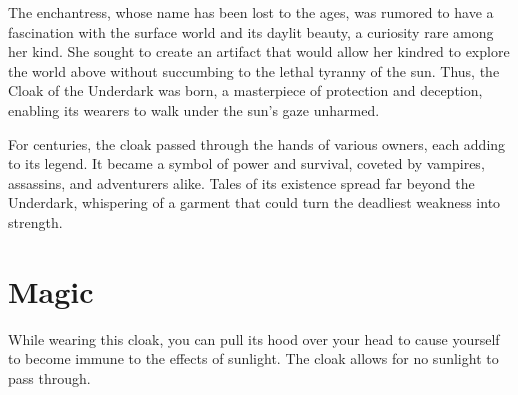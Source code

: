 The enchantress, whose name has been lost to the ages, was rumored to have a fascination with the surface world and its daylit beauty, a curiosity rare among her kind. She sought to create an artifact that would allow her kindred to explore the world above without succumbing to the lethal tyranny of the sun. Thus, the Cloak of the Underdark was born, a masterpiece of protection and deception, enabling its wearers to walk under the sun's gaze unharmed.

For centuries, the cloak passed through the hands of various owners, each adding to its legend. It became a symbol of power and survival, coveted by vampires, assassins, and adventurers alike. Tales of its existence spread far beyond the Underdark, whispering of a garment that could turn the deadliest weakness into strength.

\section*{Magic}
While wearing this cloak, you can pull its hood over your head to cause yourself to become immune to the effects of sunlight. The cloak allows for no sunlight to pass through.